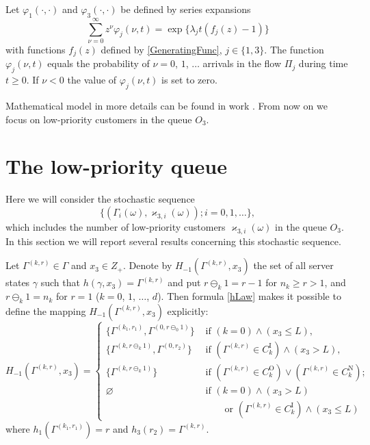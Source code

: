\documentclass[runningheads,a4paper]{llncs}
\begin{document}
Let $\varphi_1(\cdot,\cdot)$ and $\varphi_3(\cdot,\cdot)$ be defined by series expansions
\begin{equation*}
\sum_{\nu=0}^{\infty} z^\nu\varphi_j(\nu,t) = \exp\{\lambda_j t (f_j(z)-1)\}
\end{equation*}
with functions $f_j(z)$ defined by \eqref{GeneratingFunc}, $j \in \{1,3\}$. The function
$\varphi_j(\nu,t)$ equals the probability of  $\nu=0$, $1$, $\ldots${} arrivals in the flow
$\Pi_j$ during time $t \geqslant 0$. If $\nu < 0$ the value of $\varphi_j(\nu,t)$ is set to
zero.

Mathematical model in more details can be found in work \cite{k:z:2016}. From now on we focus on low-priority customers in the queue $O_3$. 

\section{The low-priority queue}
Here we will consider the stochastic sequence
\begin{equation}
\label{eq:theMC}
\{(\Gamma_i(\omega), \varkappa_{3, i}(\omega)); i =0, 1, \ldots\},
\end{equation}
which includes the number of low-priority customers $\varkappa_{3, i}(\omega)$ in the queue $O_3$.  In this
section we will report several results concerning this stochastic sequence.

Let $\Gamma^{(k,r)}\in \Gamma$ and $x_3 \in Z_+$. Denote by 
$H_{-1}(\Gamma^{(k,r)}, x_3)$ the set of all server states $\gamma$ such that $h(\gamma, x_3) =
\Gamma^{(k,r)}$ and put $r \ominus_k 1
= r-1$ for $n_k \geqslant r>1$, and $r \ominus_k 1 = n_k$ for $r=1$ ($k = 0$, $1$, $\ldots$, $d$).
Then formula \eqref{hLaw} makes it possible to define  the mapping $H_{-1}(\Gamma^{(k,r)}, x_3)$ explicitly:
\begin{equation}
H_{-1}(\Gamma^{(k,r)}, x_3) = 
\begin{cases}
\bigl\{\Gamma^{(k_1,r_1)}, \Gamma^{(0,r\ominus_0 1)}\bigr\}&  \text{ if  $(k=0) \wedge (x_3 \leqslant L)$,}\\
\bigl\{\Gamma^{(k,r\ominus_k 1)}, \Gamma^{(0,r_2)}\bigr\}&  \text{ if  $(\Gamma^{(k,r)}\in C_k^{\mathrm{I}})
  \wedge (x_3>L)$,}\\ 
\bigl\{\Gamma^{(k,r\ominus_k 1)}\bigr\}&  \text{ if  $(\Gamma^{(k,r)}\in C_k^{\mathrm{O}}) \vee (\Gamma^{(k,r)}\in C_k^{\mathrm{N}})$;}\\
\varnothing&  \text{ if  $(k = 0)\wedge  (x_3>L)$}\\
 & \qquad \text{ or $(\Gamma^{(k,r)}\in C_k^{\mathrm{I}}) \wedge (x_3\leqslant L)$}
\end{cases}
\end{equation}
where $h_1(\Gamma^{(k_1,r_1)})=r$ and $h_3(r_2)=\Gamma^{(k,r)}$.
\end{document}
